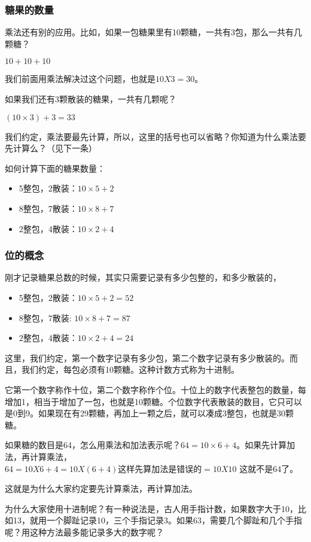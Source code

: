 \subsubsection{糖果的数量}
    
乘法还有别的应用。比如，如果一包糖果里有10颗糖，一共有3包，那么一共有几颗糖？

    $10 + 10 + 10$
  
我们前面用乘法解决过这个问题，也就是$10X3=30$。

如果我们还有3颗散装的糖果，一共有几颗呢？

    $(10\times3) + 3 = 33$

 我们约定，乘法要最先计算，所以，这里的括号也可以省略？你知道为什么乘法要先计算么？（见下一条）

 如何计算下面的糖果数量：
 \begin{itemize}
    \item 5整包，2散装：$10\times5+2$
    \item 8整包，7散装：$10\times8+7$
    \item 2整包，4散装：$10\times2+4$
 \end{itemize}
 

\subsubsection{位的概念}
刚才记录糖果总数的时候，其实只需要记录有多少包整的，和多少散装的，
\begin{itemize}
 \item 5整包，2散装：$10\times5+2 = 52$
 \item 8整包，7散装: $10\times8+7 = 87$
 \item 2整包，4散装：$10\times2+4 = 24$
\end{itemize}

这里，我们约定，第一个数字记录有多少包，第二个数字记录有多少散装的。而且，我们约定，每包必须有10颗糖。这种计数方式称为十进制。

它第一个数字称作十位，第二个数字称作个位。十位上的数字代表整包的数量，每增加1，相当于增加了一包，也就是10颗糖。个位数字代表散装的数目，它只可以是0到9。如果现在有29颗糖，再加上一颗之后，就可以凑成3整包，也就是30颗糖。

如果糖的数目是64，怎么用乘法和加法表示呢？$64=10\times6+4$。如果先计算加法，再计算乘法，
    $64=10X6+4
        =10X(6+4)  这样先算加法是错误的
        =10X10$  这就不是64了。
    
 这就是为什么大家约定要先计算乘法，再计算加法。

 为什么大家使用十进制呢？有一种说法是，古人用手指计数，如果数字大于10，比如13，就用一个脚趾记录10，三个手指记录3。如果63，需要几个脚趾和几个手指呢？用这种方法最多能记录多大的数字呢？

